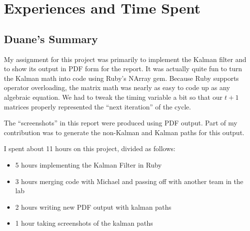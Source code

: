 \chapter{Experiences and Time Spent}\label{chap:exp}
\section{Duane's Summary}
My assignment for this project was primarily to implement the Kalman filter and to show its output in PDF form for the report.  It was actually quite fun to turn the Kalman math into code using Ruby's NArray gem.  Because Ruby supports operator overloading, the matrix math was nearly as easy to code up as any algebraic equation.  We had to tweak the timing variable a bit so that our $t+1$ matrices properly represented the ``next iteration'' of the cycle.
\par
The ``screenshots'' in this report were produced using PDF output.  Part of my contribution was to generate the non-Kalman and Kalman paths for this output.
\par
I spent about 11 hours on this project, divided as follows:
\begin{itemize}
    \item 5 hours implementing the Kalman Filter in Ruby
    \item 3 hours merging code with Michael and passing off with another team in the lab
    \item 2 hours writing new PDF output with kalman paths
    \item 1 hour taking screenshots of the kalman paths
\end{itemize}

